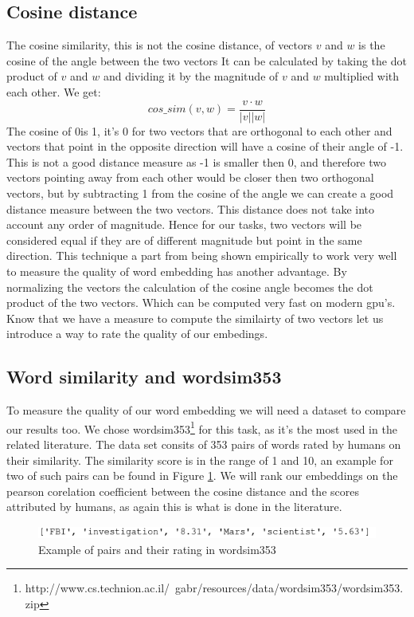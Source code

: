 \subsection{Cosine distance}
The cosine similarity, this is not the cosine distance, of vectors $v$ and $w$ is the cosine of the angle between the two vectors It can be calculated by taking the dot product of $v$ and $w$ and dividing it by the magnitude of $v$ and $w$ multiplied with each other. We get:
\begin{equation}
cos\_sim(v,w) = \frac{v \cdot w}{|v| |w|} 
\end{equation}
The cosine of 0\textdegree is 1,  it's 0 for two vectors that are orthogonal to each other and vectors that point in the opposite direction will have a cosine of their angle of -1. This is not a good distance measure as -1 is smaller then 0, and therefore two vectors pointing away from each other would be closer then two orthogonal vectors, but by subtracting 1 from the cosine of the angle we can create a good distance measure  between the two vectors. This distance does not take into account any order of magnitude. Hence for our tasks, two vectors will be considered equal if they are of different magnitude but point in the same direction. 
This technique a part from being shown empirically to work very well to measure the quality of word embedding has another advantage. By normalizing the vectors the calculation of the cosine angle becomes the dot product of the two vectors. Which can be computed very fast on modern gpu's. 
Know that we have a measure to compute the similairty of two vectors let us introduce a way to rate the quality of our embedings.


\subsection{Word similarity and wordsim353}
To measure the quality of our word embedding we will need a dataset to compare our results too. We chose  wordsim353\footnote{http://www.cs.technion.ac.il/~gabr/resources/data/wordsim353/wordsim353.zip} for this task, as it's the most used in the related literature. The data set consits of 353 pairs of words rated by humans on their similarity. The similarity score is in the range of 1 and 10, an example for two of such pairs can be found in Figure \ref{fig:ws353_ex}. We will rank our embeddings on the pearson corelation coefficient between the cosine distance and the scores attributed by humans, as again this is what is done in the literature. 
\begin{figure}[ht]
    \centering
			\includegraphics[scale=0.7]{images/wordsim353_example} 
    \caption{Example of pairs and their rating in wordsim353}
    \label{fig:ws353_ex}
\end{figure}

